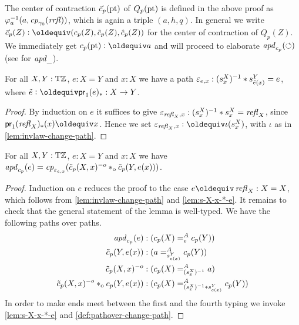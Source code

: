 \documentclass[a4paper,12pt]{amsart}
\begin{document}
The center of contraction $\vec{c}_p({\mathord{\mathrm{pt}}})$ of $Q_p({\mathord{\mathrm{pt}}})$ is 
defined in the above proof as $\varphi_{a}^{-1}(a,\mathit{cp}_{\gamma_0}(\mathit{rrfl}))$, 
which is again a triple $(a,h,q)$. In general we write
$\vec{c}_p(Z)\defeq(c_p(Z),\tilde{c}_p(Z),\hat{c}_p(Z))$
for the center of contraction of $Q_p(Z)$.
We immediately get $c_p(\pt)\defeq a$ and will proceed to
elaborate $\mathop{{\it apd}_{c_p}}(\circlearrowleft)$ (see \cite[Ch. 2.3]{hottbook} for $\mathop{{\it apd}_{\_}}$).


\begin{lemma}\label{lem:s-X-x-*-e}
  For all $X,Y:{\mathrm{T}\mathbb{Z}}$, $e: X=Y$ and $x:X$ we have a path 
  $\varepsilon_{e,x} : (s^X_x)^{-1} * s^Y_{\tilde {e}(x)} = e$,
  where $\ptoe{e}\defeq \mathsf{pr}_1(e)_* : X\to Y$.
\end{lemma}
\begin{proof}
By induction on $e$ it suffices to give
$\varepsilon_{\mathop{{\it refl}_{X}},x} : (s^X_x)^{-1} * s^X_x = \mathop{{\it refl}_{X}}$,
since $\mathsf{pr}_1(\refl{X})_*(x) \jdeq x$.
Hence we set $\varepsilon_{\refl{X},x} \defeq \iota(s^X_x)$,
with $\iota$ as in \cref{lem:invlaw-change-path}. 
\end{proof}


\begin{lemma}\label{lem:apd-c-tilde-c}
For all $X,Y:{\mathrm{T}\mathbb{Z}}$, $e: X=Y$ and $x:X$ we have
$\mathop{{\it apd}_{c_p}}(e) = \mathit{cp}_{\varepsilon_{e,x}}
(\tilde c_p(X,x)^{-o}*_{\mathrm{o}} \tilde c_p(Y,e(x)))$.
\end{lemma}
\begin{proof}
Induction on $e$ reduces the proof to the case $e\jdeq\refl{X}: X=X$,
which follows from \cref{lem:invlaw-change-path} and \cref{lem:s-X-x-*-e}.
It remains to check that the general statement of the lemma is well-typed.
We have the following paths over paths.
\begin{align*}
\mathop{{\it apd}_{c_p}}(e) &: (c_p(X) =^A_e c_p(Y))\\
\tilde c_p(Y,e(x)) &:  (a =^A_{s^Y_{e(x)}} c_p(Y))\\
\tilde c_p(X,x)^{-o} &: (c_p(X) =^A_{(s^X_x)^{-1}} a)\\
\tilde c_p(X,x)^{-o} *_{\mathrm{o}} c_p(Y,e(x)) &: 
     (c_p(X) =^A_{(s^X_x)^{-1}* s^Y_{e(x)}} c_p(Y))\\
\end{align*}
In order to make ends meet between the first and the fourth typing
we invoke \cref{lem:s-X-x-*-e} and \cref{def:pathover-change-path}.
\end{proof}
\end{document}
